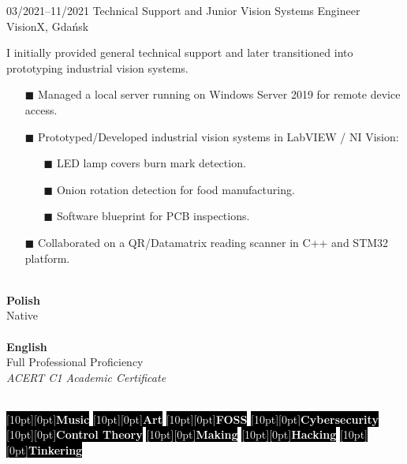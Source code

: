 \documentclass[9pt]{./src/packages/Developer_CV/developercv}
\begin{document}
\begin{entrylist}
    \entry
        {03/2021--11/2021}
        {Technical Support and Junior Vision Systems Engineer}
        {VisionX, Gdańsk}
        {
        I initially provided general technical support and later transitioned into prototyping industrial vision systems.
        \begin{enumerate}
            \item[$\blacksquare$] Managed a local server running on Windows Server 2019 for remote device access.
            \item[$\blacksquare$] Prototyped/Developed industrial vision systems in LabVIEW / NI Vision:
            \begin{enumerate}
                \item[$\blacksquare$] LED lamp covers burn mark detection.
                \item[$\blacksquare$] Onion rotation detection for food manufacturing.
                \item[$\blacksquare$] Software blueprint for PCB inspections.
            \end{enumerate}
            \item[$\blacksquare$] Collaborated on a QR/Datamatrix reading scanner in C++ and STM32 platform.
        \end{enumerate}
        }
    \end{entrylist}


\begin{minipage}[t]{0.5\textwidth}
    \\
    \textbf{Polish}\\Native\\ \\
    \textbf{English}\\Full Professional Proficiency \\
    \textit{ACERT C1 Academic Certificate}
\end{minipage}
\hfill
\begin{minipage}[t]{0.5\textwidth}
    \raggedright %
    \\
    \colorbox{black}{\textcolor{white}{\raisebox{0.5ex}[10pt][0pt]{\textbf{Music}}}}
    \colorbox{black}{\textcolor{white}{\raisebox{0.5ex}[10pt][0pt]{\textbf{Art}}}}
    \colorbox{black}{\textcolor{white}{\raisebox{0.5ex}[10pt][0pt]{\textbf{FOSS}}}}
    \colorbox{black}{\textcolor{white}{\raisebox{0.5ex}[10pt][0pt]{\textbf{Cybersecurity}}}}
    \colorbox{black}{\textcolor{white}{\raisebox{0.5ex}[10pt][0pt]{\textbf{Control Theory}}}}
    \colorbox{black}{\textcolor{white}{\raisebox{0.5ex}[10pt][0pt]{\textbf{Making}}}}
    \colorbox{black}{\textcolor{white}{\raisebox{0.5ex}[10pt][0pt]{\textbf{Hacking}}}}
    \colorbox{black}{\textcolor{white}{\raisebox{0.5ex}[10pt][0pt]{\textbf{Tinkering}}}}
\end{minipage}
\end{document}
